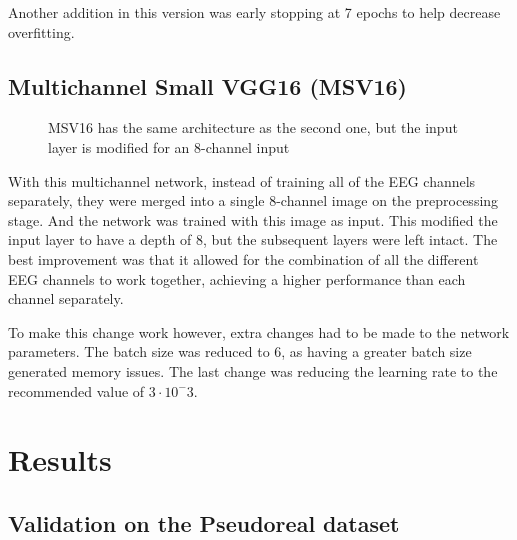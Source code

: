 \documentclass[conference]{IEEEtran}
\begin{document}
Another addition in this version was early stopping at 7 epochs to help decrease overfitting. 

\subsection{Multichannel Small VGG16 (MSV16)}

\begin{figure}[h]

\caption[MSV16 Neural Network]{MSV16 has the same architecture as the second one, but the input layer is modified for an 8-channel input}
\label{fig:nnv3}
\end{figure}

With this multichannel network, instead of training all of the EEG channels separately, they were merged into a single 8-channel image on the preprocessing stage. And the network was trained with this image as input. This modified the input layer to have a depth of 8, but the subsequent layers were left intact. The best improvement was that it allowed for the combination of all the different EEG channels to work together, achieving a higher performance than each channel separately.

To make this change work however, extra changes had to be made to the network parameters. The batch size was reduced to 6, as having a greater batch size generated memory issues. The last change was reducing the learning rate to the recommended value of $3\cdot10^-3$.

\section{Results}
\label{sec:results}


\subsection{Validation on the Pseudoreal dataset}
\end{document}
